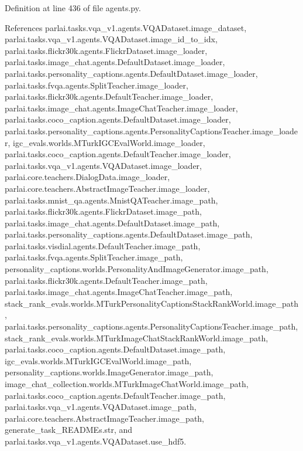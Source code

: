 Definition at line 436 of file agents.\+py.



References parlai.\+tasks.\+vqa\+\_\+v1.\+agents.\+V\+Q\+A\+Dataset.\+image\+\_\+dataset, parlai.\+tasks.\+vqa\+\_\+v1.\+agents.\+V\+Q\+A\+Dataset.\+image\+\_\+id\+\_\+to\+\_\+idx, parlai.\+tasks.\+flickr30k.\+agents.\+Flickr\+Dataset.\+image\+\_\+loader, parlai.\+tasks.\+image\+\_\+chat.\+agents.\+Default\+Dataset.\+image\+\_\+loader, parlai.\+tasks.\+personality\+\_\+captions.\+agents.\+Default\+Dataset.\+image\+\_\+loader, parlai.\+tasks.\+fvqa.\+agents.\+Split\+Teacher.\+image\+\_\+loader, parlai.\+tasks.\+flickr30k.\+agents.\+Default\+Teacher.\+image\+\_\+loader, parlai.\+tasks.\+image\+\_\+chat.\+agents.\+Image\+Chat\+Teacher.\+image\+\_\+loader, parlai.\+tasks.\+coco\+\_\+caption.\+agents.\+Default\+Dataset.\+image\+\_\+loader, parlai.\+tasks.\+personality\+\_\+captions.\+agents.\+Personality\+Captions\+Teacher.\+image\+\_\+loader, igc\+\_\+evals.\+worlds.\+M\+Turk\+I\+G\+C\+Eval\+World.\+image\+\_\+loader, parlai.\+tasks.\+coco\+\_\+caption.\+agents.\+Default\+Teacher.\+image\+\_\+loader, parlai.\+tasks.\+vqa\+\_\+v1.\+agents.\+V\+Q\+A\+Dataset.\+image\+\_\+loader, parlai.\+core.\+teachers.\+Dialog\+Data.\+image\+\_\+loader, parlai.\+core.\+teachers.\+Abstract\+Image\+Teacher.\+image\+\_\+loader, parlai.\+tasks.\+mnist\+\_\+qa.\+agents.\+Mnist\+Q\+A\+Teacher.\+image\+\_\+path, parlai.\+tasks.\+flickr30k.\+agents.\+Flickr\+Dataset.\+image\+\_\+path, parlai.\+tasks.\+image\+\_\+chat.\+agents.\+Default\+Dataset.\+image\+\_\+path, parlai.\+tasks.\+personality\+\_\+captions.\+agents.\+Default\+Dataset.\+image\+\_\+path, parlai.\+tasks.\+visdial.\+agents.\+Default\+Teacher.\+image\+\_\+path, parlai.\+tasks.\+fvqa.\+agents.\+Split\+Teacher.\+image\+\_\+path, personality\+\_\+captions.\+worlds.\+Personality\+And\+Image\+Generator.\+image\+\_\+path, parlai.\+tasks.\+flickr30k.\+agents.\+Default\+Teacher.\+image\+\_\+path, parlai.\+tasks.\+image\+\_\+chat.\+agents.\+Image\+Chat\+Teacher.\+image\+\_\+path, stack\+\_\+rank\+\_\+evals.\+worlds.\+M\+Turk\+Personality\+Captions\+Stack\+Rank\+World.\+image\+\_\+path, parlai.\+tasks.\+personality\+\_\+captions.\+agents.\+Personality\+Captions\+Teacher.\+image\+\_\+path, stack\+\_\+rank\+\_\+evals.\+worlds.\+M\+Turk\+Image\+Chat\+Stack\+Rank\+World.\+image\+\_\+path, parlai.\+tasks.\+coco\+\_\+caption.\+agents.\+Default\+Dataset.\+image\+\_\+path, igc\+\_\+evals.\+worlds.\+M\+Turk\+I\+G\+C\+Eval\+World.\+image\+\_\+path, personality\+\_\+captions.\+worlds.\+Image\+Generator.\+image\+\_\+path, image\+\_\+chat\+\_\+collection.\+worlds.\+M\+Turk\+Image\+Chat\+World.\+image\+\_\+path, parlai.\+tasks.\+coco\+\_\+caption.\+agents.\+Default\+Teacher.\+image\+\_\+path, parlai.\+tasks.\+vqa\+\_\+v1.\+agents.\+V\+Q\+A\+Dataset.\+image\+\_\+path, parlai.\+core.\+teachers.\+Abstract\+Image\+Teacher.\+image\+\_\+path, generate\+\_\+task\+\_\+\+R\+E\+A\+D\+M\+Es.\+str, and parlai.\+tasks.\+vqa\+\_\+v1.\+agents.\+V\+Q\+A\+Dataset.\+use\+\_\+hdf5.



